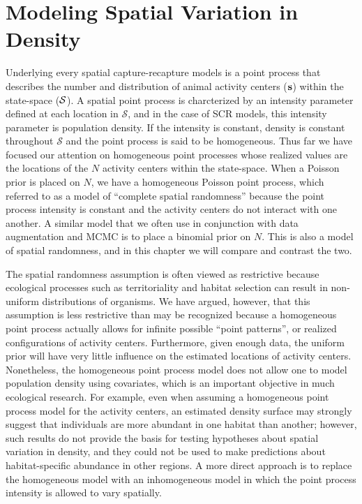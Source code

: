 


\chapter{%
Modeling Spatial Variation in Density
}
\label{chapt.state-space}

\vspace{0.3cm}

Underlying every spatial capture-recapture models is a point process
that describes the number and distribution of animal activity
centers (${\bf s}$) within the state-space ($\cal{S}$).
A spatial point process is charcterized by %
an intensity parameter defined at each location in $\mathcal{S}$, and
in the case of SCR models, this intensity parameter is population
density. If the intensity is constant, density is constant throughout
$\mathcal{S}$ and the point process is said to be homogeneous.
Thus far we have focused our attention on homogeneous %
point processes whose realized values are the locations of the $N$
activity centers within the state-space. When a Poisson prior is
placed on $N$, we have a homogeneous Poisson point process, which
referred to as a model of ``complete spatial randomness''
because the point process intensity is constant
and the activity centers do not interact with one another. A similar
model that we often use in conjunction with data augmentation and MCMC
is to place a binomial prior on $N$. This is also a model of spatial
randomness, and in this chapter we will compare and contrast the two.

The spatial randomness assumption is often viewed as restrictive
because ecological processes such as
territoriality and habitat selection can result in non-uniform
distributions of organisms. We have argued, however, that this
assumption is less restrictive than may be recognized because a
homogeneous point process actually allows for infinite
possible ``point patterns'', or realized configurations of activity
centers. Furthermore, given enough data,
the uniform prior will have very little influence on the estimated
locations of activity centers. Nonetheless, the homogeneous point
process model does not allow one to model population density using
covariates, which is an important objective in much ecological research.
For example, even when assuming a homogeneous point process model for
the activity centers, an estimated density surface may strongly
suggest that individuals are more abundant in one habitat than
another; however, such results do not provide the basis for testing
hypotheses about spatial variation in density, and they could not be
used to make predictions about habitat-specific abundance in other
regions. A more direct approach is to replace the homogeneous model
with an inhomogeneous model in which the point process intensity
is allowed to vary spatially.

